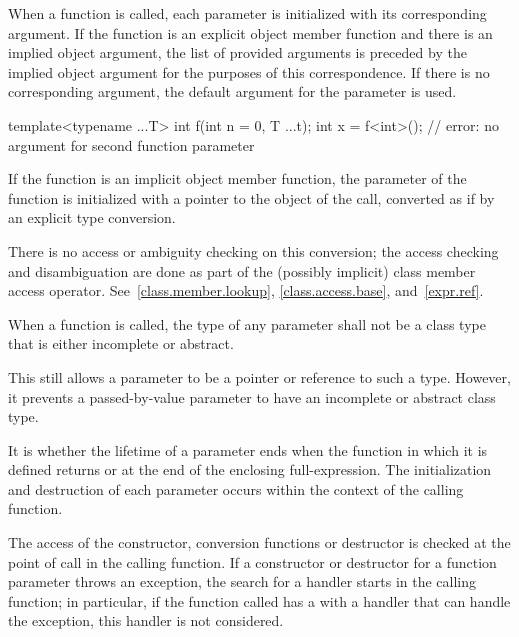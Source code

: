 \pnum
{}%
%
%
When a function is called, each parameter is
initialized with
its corresponding argument.
If the function is an explicit object member function and
there is an implied object argument,
the list of provided arguments is preceded by the implied object argument
for the purposes of this correspondence.
If there is no corresponding argument,
the default argument for the parameter is used.
\begin{example}
\begin{codeblock}
template<typename ...T> int f(int n = 0, T ...t);
int x = f<int>();               // error: no argument for second function parameter
\end{codeblock}
\end{example}
If the function is an implicit object member
function, the  parameter of the function
is initialized with a pointer to the object of the call, converted
as if by an explicit type conversion.
\begin{note}
There is no access or ambiguity checking on this conversion; the access
checking and disambiguation are done as part of the (possibly implicit)
class member access operator.
See~\ref{class.member.lookup}, \ref{class.access.base},
and~\ref{expr.ref}.
\end{note}
When a function is called, the type of any parameter
shall not be a class type that is either incomplete or abstract.
\begin{note}
This still allows a parameter to be a pointer or reference to such
a type. However, it prevents a passed-by-value parameter
to have an incomplete or abstract class type.
\end{note}
It is  whether the
lifetime of a parameter ends when the function in which it is defined
returns or at the end of the enclosing full-expression.
The initialization and destruction of each parameter occurs
within the context of the calling function.
\begin{example}
The access of the constructor, conversion functions or destructor is
checked at the point of call in the calling function. If a constructor
or destructor for a function parameter throws an exception, the search
for a handler starts in the calling function; in
particular, if the function called has a 
with a handler that can handle the exception,
this handler is not considered.
\end{example}

